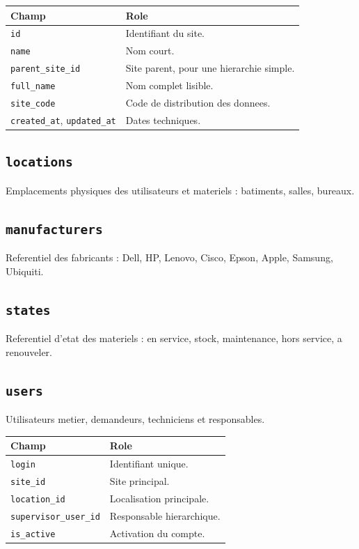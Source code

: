 \documentclass[11pt,a4paper]{article}
\begin{document}
\begin{longtable}{|p{4cm}|p{10cm}|}
\hline
\textbf{Champ} & \textbf{Role} \\
\hline
\texttt{id} & Identifiant du site. \\
\hline
\texttt{name} & Nom court. \\
\hline
\texttt{parent\_site\_id} & Site parent, pour une hierarchie simple. \\
\hline
\texttt{full\_name} & Nom complet lisible. \\
\hline
\texttt{site\_code} & Code de distribution des donnees. \\
\hline
\texttt{created\_at}, \texttt{updated\_at} & Dates techniques. \\
\hline
\end{longtable}

\subsection{\texttt{locations}}

Emplacements physiques des utilisateurs et materiels : batiments, salles, bureaux.

\subsection{\texttt{manufacturers}}

Referentiel des fabricants : Dell, HP, Lenovo, Cisco, Epson, Apple, Samsung, Ubiquiti.

\subsection{\texttt{states}}

Referentiel d'etat des materiels : en service, stock, maintenance, hors service, a renouveler.

\subsection{\texttt{users}}

Utilisateurs metier, demandeurs, techniciens et responsables.

\begin{longtable}{|p{4cm}|p{10cm}|}
\hline
\textbf{Champ} & \textbf{Role} \\
\hline
\texttt{login} & Identifiant unique. \\
\hline
\texttt{site\_id} & Site principal. \\
\hline
\texttt{location\_id} & Localisation principale. \\
\hline
\texttt{supervisor\_user\_id} & Responsable hierarchique. \\
\hline
\texttt{is\_active} & Activation du compte. \\
\hline
\end{longtable}
\end{document}
